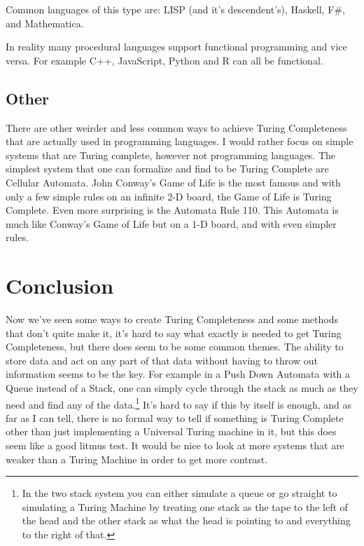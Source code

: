 \documentclass{article}
\begin{document}
	Common languages of this type are: LISP (and it's descendent's), Haskell, F\#, and Mathematica.
	
	In reality many procedural languages support functional programming and vice versa. For example C++, JavaScript, Python and R can all be functional.
	
	\subsection{Other}
	
	There are other weirder and less common ways to achieve Turing Completeness that are actually used in programming languages. I would rather focus on simple systems that are Turing complete, however not programming languages. The simplest system that one can formalize and find to be Turing Complete are Cellular Automata. John Conway's Game of Life is the most famous and with only a few simple rules on an infinite 2-D board, the Game of Life is Turing Complete. Even more surprising is the Automata Rule 110. This Automata is much like Conway's Game of Life but on a 1-D board, and with even simpler rules.
	
	\section{Conclusion}
	Now we've seen some ways to create Turing Completeness and some methods that don't quite make it, it's hard to say what exactly is needed to get Turing Completeness, but there does seem to be some common themes. The ability to store data and act on any part of that data without having to throw out information seems to be the key. For example in a Push Down Automata with a Queue instead of a Stack, one can simply cycle through the stack as much as they need and find any of the data.\footnote{In the two stack system you can either simulate a queue or go straight to simulating a Turing Machine by treating one stack as the tape to the left of the head and the other stack as what the head is pointing to and everything to the right of that.} It's hard to say if this by itself is enough, and as far as I can tell, there is no formal way to tell if something is Turing Complete other than just implementing a Universal Turing machine in it, but this does seem like a good litmus test. It would be nice to look at more systems that are weaker than a Turing Machine in order to get more contrast.
	
\end{document}
